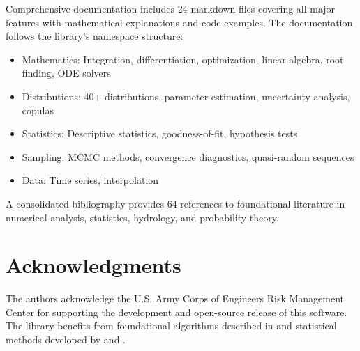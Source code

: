 \documentclass[10pt,a4paper,onecolumn]{article}
\begin{document}
Comprehensive documentation includes 24 markdown files covering all major features with mathematical explanations and code examples. The documentation follows the library's namespace structure:

\begin{itemize}
    \item Mathematics: Integration, differentiation, optimization, linear algebra, root finding, ODE solvers
    \item Distributions: 40+ distributions, parameter estimation, uncertainty analysis, copulas
    \item Statistics: Descriptive statistics, goodness-of-fit, hypothesis tests
    \item Sampling: MCMC methods, convergence diagnostics, quasi-random sequences
    \item Data: Time series, interpolation
\end{itemize}

A consolidated bibliography provides 64 references to foundational literature in numerical analysis, statistics, hydrology, and probability theory.

\section*{Acknowledgments}

The authors acknowledge the U.S. Army Corps of Engineers Risk Management Center for supporting the development and open-source release of this software. The library benefits from foundational algorithms described in \citet{press2007} and statistical methods developed by \citet{hosking1990} and \citet{hosking1997}.



\end{document}
